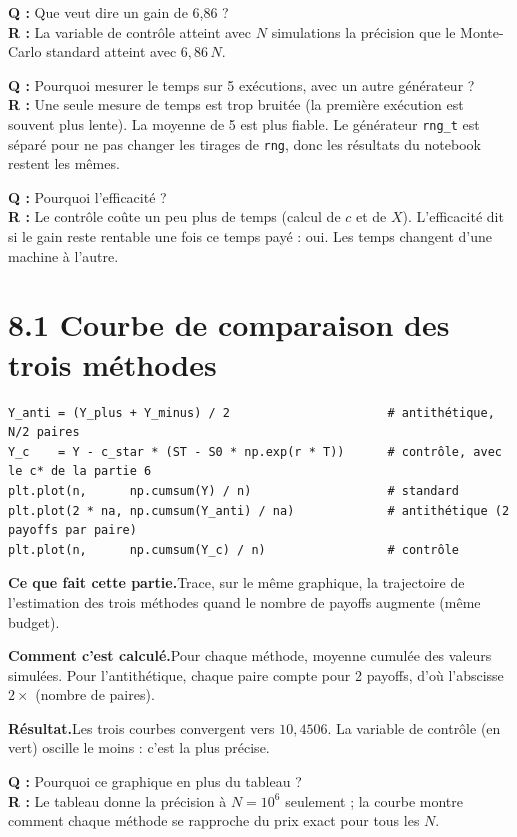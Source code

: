 \documentclass[11pt,a4paper]{article}
\newcommand{\quoi}[1]{\par\noindent\textbf{\color{bleu}Ce que fait cette partie.}\enspace #1\par}
\newcommand{\calcul}[1]{\par\noindent\textbf{\color{bleu}Comment c'est calculé.}\enspace #1\par}
\newcommand{\resultat}[1]{\par\noindent\textbf{\color{vert}Résultat.}\enspace #1\par}
\newcommand{\prof}[2]{\begin{tcolorbox}[colback=orange!6,colframe=orange!80,boxrule=0.4pt,arc=2pt,left=5pt,right=5pt,top=2pt,bottom=2pt]\small\textbf{Q :} #1\\[1pt]\textbf{R :} #2\end{tcolorbox}}
\newcommand{\sect}[1]{\clearpage\section{#1}}
\begin{document}
\prof{Que veut dire un gain de 6,86 ?}{La variable de contrôle atteint avec $N$ simulations la précision que le Monte-Carlo standard atteint avec $6{,}86\,N$.}
\prof{Pourquoi mesurer le temps sur 5 exécutions, avec un autre générateur ?}{Une seule mesure de temps est trop bruitée (la première exécution est souvent plus lente). La moyenne de 5 est plus fiable. Le générateur \texttt{rng\_t} est séparé pour ne pas changer les tirages de \texttt{rng}, donc les résultats du notebook restent les mêmes.}
\prof{Pourquoi l'efficacité ?}{Le contrôle coûte un peu plus de temps (calcul de $c$ et de $X$). L'efficacité dit si le gain reste rentable une fois ce temps payé : oui. Les temps changent d'une machine à l'autre.}

\sect{8.1 Courbe de comparaison des trois méthodes}
\begin{lstlisting}
Y_anti = (Y_plus + Y_minus) / 2                      # antithétique, N/2 paires
Y_c    = Y - c_star * (ST - S0 * np.exp(r * T))      # contrôle, avec le c* de la partie 6
plt.plot(n,      np.cumsum(Y) / n)                   # standard
plt.plot(2 * na, np.cumsum(Y_anti) / na)             # antithétique (2 payoffs par paire)
plt.plot(n,      np.cumsum(Y_c) / n)                 # contrôle
\end{lstlisting}
\quoi{Trace, sur le même graphique, la trajectoire de l'estimation des trois méthodes quand le nombre de payoffs augmente (même budget).}
\calcul{Pour chaque méthode, moyenne cumulée des valeurs simulées. Pour l'antithétique, chaque paire compte pour 2 payoffs, d'où l'abscisse $2\times$ (nombre de paires).}
\resultat{Les trois courbes convergent vers $10{,}4506$. La variable de contrôle (en vert) oscille le moins : c'est la plus précise.}
\prof{Pourquoi ce graphique en plus du tableau ?}{Le tableau donne la précision à $N = 10^6$ seulement ; la courbe montre comment chaque méthode se rapproche du prix exact pour tous les $N$.}
\end{document}
